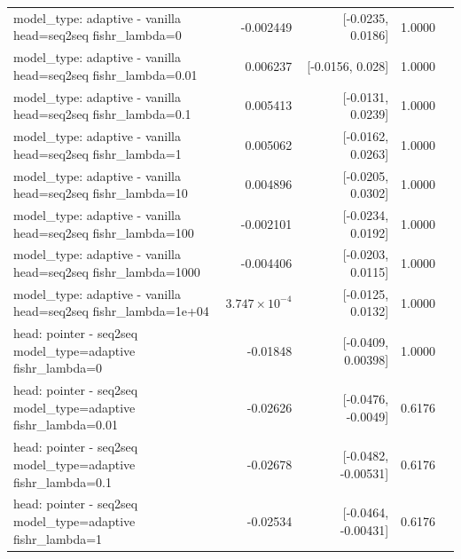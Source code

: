 \documentclass[10pt]{article}
\makeatletter
\newcommand{\stackcell}[1]{\begin{tabular}[t]{@{}l@{}}#1\end{tabular}}
\makeatother
\begin{document}
{\begin{longtable}{lrrrl}
\stackcell{model\_type: adaptive - vanilla\\\footnotesize head=seq2seq fishr\_lambda=0 } & -0.002449 & [-0.0235, 0.0186] & 1.0000 & \\
\stackcell{model\_type: adaptive - vanilla\\\footnotesize head=seq2seq fishr\_lambda=0.01 } & 0.006237 & [-0.0156, 0.028] & 1.0000 & \\
\stackcell{model\_type: adaptive - vanilla\\\footnotesize head=seq2seq fishr\_lambda=0.1 } & 0.005413 & [-0.0131, 0.0239] & 1.0000 & \\
\stackcell{model\_type: adaptive - vanilla\\\footnotesize head=seq2seq fishr\_lambda=1 } & 0.005062 & [-0.0162, 0.0263] & 1.0000 & \\
\stackcell{model\_type: adaptive - vanilla\\\footnotesize head=seq2seq fishr\_lambda=10 } & 0.004896 & [-0.0205, 0.0302] & 1.0000 & \\
\stackcell{model\_type: adaptive - vanilla\\\footnotesize head=seq2seq fishr\_lambda=100 } & -0.002101 & [-0.0234, 0.0192] & 1.0000 & \\
\stackcell{model\_type: adaptive - vanilla\\\footnotesize head=seq2seq fishr\_lambda=1000 } & -0.004406 & [-0.0203, 0.0115] & 1.0000 & \\
\stackcell{model\_type: adaptive - vanilla\\\footnotesize head=seq2seq fishr\_lambda=1e+04 } & $3.747\times10^{-4}$ & [-0.0125, 0.0132] & 1.0000 & \\
\stackcell{head: pointer - seq2seq\\\footnotesize model\_type=adaptive fishr\_lambda=0 } & -0.01848 & [-0.0409, 0.00398] & 1.0000 & \\
\stackcell{head: pointer - seq2seq\\\footnotesize model\_type=adaptive fishr\_lambda=0.01 } & -0.02626 & [-0.0476, -0.0049] & 0.6176 & \\
\stackcell{head: pointer - seq2seq\\\footnotesize model\_type=adaptive fishr\_lambda=0.1 } & -0.02678 & [-0.0482, -0.00531] & 0.6176 & \\
\stackcell{head: pointer - seq2seq\\\footnotesize model\_type=adaptive fishr\_lambda=1 } & -0.02534 & [-0.0464, -0.00431] & 0.6176 & \\

\end{longtable}}
\end{document}

